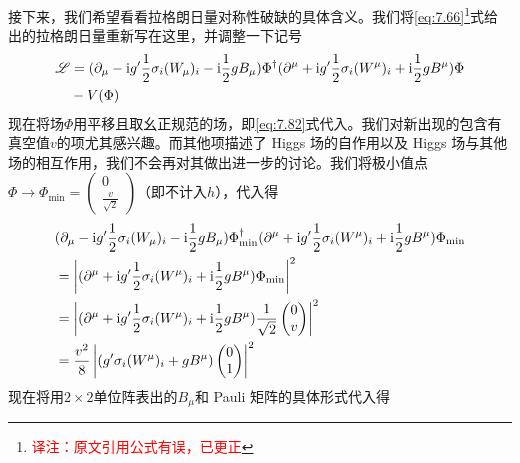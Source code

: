 接下来，我们希望看看拉格朗日量对称性破缺的具体含义。我们将\ref{eq:7.66}\footnote{\textcolor{red}{译注：原文引用公式有误，已更正}}式给出的拉格朗日量重新写在这里，并调整一下记号
\begin{equation}
\begin{aligned}
{\mathscr L} &= (\partial_\mu-\mathrm i g'\frac{1}{2}\sigma_i(W_\mu)_i-\mathrm i\frac{1}{2}gB_\mu)\Phi^\dag(\partial^\mu+\mathrm i g'\frac{1}{2}\sigma_i(W^\mu)_i+\mathrm i\frac{1}{2}gB^\mu)\Phi \\
 & -V(\Phi)
\end{aligned}
\end{equation}
现在将场$\Phi$用平移且取幺正规范的场，即\ref{eq:7.82}式代入。我们对新出现的包含有真空值$v$的项尤其感兴趣。而其他项描述了 Higgs 场的自作用以及 Higgs 场与其他场的相互作用，我们不会再对其做出进一步的讨论。我们将极小值点$\Phi\rightarrow\Phi_{\min}= \begin{pmatrix}
0 \\\frac{v}{\sqrt{2}}
\end{pmatrix}$（即不计入$h$），代入得
\[
\begin{aligned}
& (\partial_\mu-\mathrm i g'\frac{1}{2}\sigma_i(W_\mu)_i-\mathrm i\frac{1}{2}gB_\mu)\Phi^\dag_{\min}(\partial^\mu+\mathrm i g'\frac{1}{2}\sigma_i(W^\mu)_i+\mathrm i\frac{1}{2}gB^\mu)\Phi_{\min} \\
& = \left|(\partial^\mu+\mathrm i g'\frac{1}{2}\sigma_i(W^\mu)_i+\mathrm i\frac{1}{2}gB^\mu)\Phi_{\min}\right|^2 \\
& = \left|(\partial^\mu+\mathrm i g'\frac{1}{2}\sigma_i(W^\mu)_i+\mathrm i\frac{1}{2}gB^\mu)\frac{1}{\sqrt{2}}\begin{pmatrix}
0 \\ v
\end{pmatrix}\right|^2 \\
& = \frac{v^2}{8} \left|( g'\sigma_i(W^\mu)_i+gB^\mu)\begin{pmatrix} 0 \\ 1 \end{pmatrix}\right|^2
\end{aligned}
\]
现在将用$2\times 2$单位阵表出的$B_\mu$和 Pauli 矩阵的具体形式代入得
